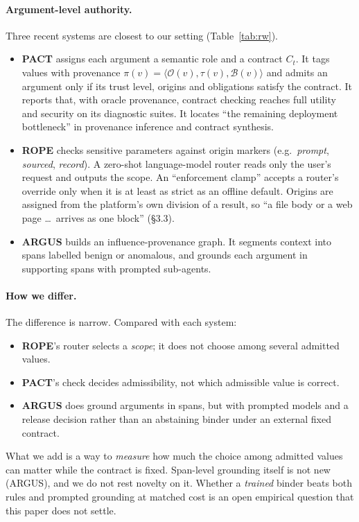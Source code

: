 \documentclass{article}
\begin{document}
\paragraph{Argument-level authority.}
Three recent systems are closest to our setting (Table~\ref{tab:rw}).
\begin{itemize}
\item \textbf{PACT} \citep{fan2026pact} assigns each argument a semantic role
and a contract $C_t$. It tags values with provenance
$\pi(v)=\langle\mathcal{O}(v),\tau(v),\mathcal{B}(v)\rangle$ and admits an
argument only if its trust level, origins and obligations satisfy the
contract. It reports that, with oracle provenance, contract checking reaches
full utility and security on its diagnostic suites. It locates ``the
remaining deployment bottleneck'' in provenance inference and contract
synthesis.
\item \textbf{ROPE} \citep{ma2026rope} checks sensitive parameters against
origin markers (e.g.\ \emph{prompt}, \emph{sourced}, \emph{record}). A
zero-shot language-model router reads only the user's request and outputs
the scope. An ``enforcement clamp'' accepts a router's override only when it
is at least as strict as an offline default. Origins are assigned from the
platform's own division of a result, so ``a file body or a web page \ldots\
arrives as one block'' (\S3.3).
\item \textbf{ARGUS} \citep{weng2026argus} builds an influence-provenance
graph. It segments context into spans labelled benign or anomalous, and
grounds each argument in supporting spans with prompted sub-agents.
\end{itemize}

\paragraph{How we differ.}
The difference is narrow. Compared with each system:
\begin{itemize}
\item \textbf{ROPE}'s router selects a \emph{scope}; it does not choose among
several admitted values.
\item \textbf{PACT}'s check decides admissibility, not which admissible value
is correct.
\item \textbf{ARGUS} does ground arguments in spans, but with prompted models
and a release decision rather than an abstaining binder under an external
fixed contract.
\end{itemize}
What we add is a way to \emph{measure} how much the choice among admitted
values can matter while the contract is fixed. Span-level grounding itself
is not new (ARGUS), and we do not rest novelty on it. Whether a \emph{trained}
binder beats both rules and prompted grounding at matched cost is an open
empirical question that this paper does not settle.
\end{document}
